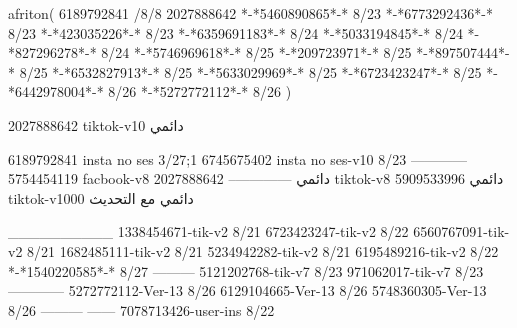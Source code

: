 afriton(
6189792841 /8/8
2027888642
*-*5460890865*-* 8/23
*-*6773292436*-* 8/23
*-*423035226*-* 8/23
*-*6359691183*-* 8/24
*-*5033194845*-* 8/24
*-*827296278*-* 8/24
*-*5746969618*-* 8/25
*-*209723971*-* 8/25
*-*897507444*-* 8/25
*-*6532827913*-* 8/25
*-*5633029969*-* 8/25
*-*6723423247*-* 8/25
*-*6442978004*-* 8/26
*-*5272772112*-* 8/26
)

2027888642 tiktok-v10
دائمي

6189792841 insta no ses
3/27;1
6745675402 insta no ses-v10
8/23
------------
5754454119 facbook-v8
دائمي
--------------
2027888642 tiktok-v8
دائمي
5909533996 tiktok-v1000
دائمي مع التحديث

__________
1338454671-tik-v2
8/21
6723423247-tik-v2
8/22
6560767091-tik-v2
8/21
1682485111-tik-v2
8/21
5234942282-tik-v2
8/21
6195489216-tik-v2
8/22
*-*1540220585*-* 8/27
---------
5121202768-tik-v7
8/23
971062017-tik-v7
8/23
------------
5272772112-Ver-13
8/26
6129104665-Ver-13
8/26
5748360305-Ver-13
8/26
---------
------
7078713426-user-ins
8/22
